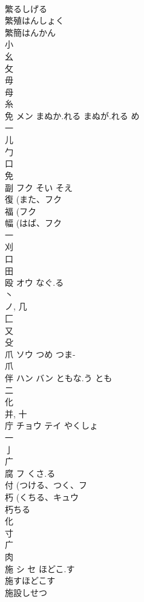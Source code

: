 \documentclass[8pt]{extreport}
\begin{document}
\begin{CJK}{UTF8}{min}
\\	繁るしげる
\\	繁殖はんしょく
\\	繁簡はんかん
\\	小 
\\	幺 
\\	攵 
\\	毋 
\\	母 
\\	糸 
\\	免	メン	まぬか.れる まぬが.れる め	
\\	一 
\\	儿 
\\	勹 
\\	口 
\\	免 
\\	副	フク	そい そえ	
\\	復 (また、フク 
\\	福 (フク 
\\	幅 (はば、フク 
\\	一 
\\	刈 
\\	口 
\\	田 
\\	殴	オウ	なぐ.る	
\\	丶 
\\	ノ, 几 
\\	匚 
\\	又 
\\	殳 
\\	爪	ソウ	つめ つま-	
\\	爪 
\\	伴	ハン バン	ともな.う とも	
\\	二 
\\	化 
\\	并, 十 
\\	庁	チョウ テイ	やくしょ	
\\	一 
\\	亅 
\\	广 
\\	腐	フ	くさ.る	
\\	付 (つける、つく、フ 
\\	朽 (くちる、キュウ 
\\	朽ちる 
\\	化 
\\	寸 
\\	广 
\\	肉 
\\	施	シ セ	ほどこ.す	
\\	施すほどこす 
\\	施設しせつ 

\end{CJK}
\end{document}
